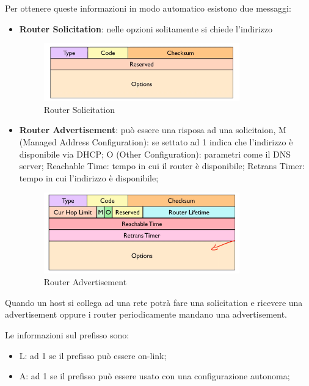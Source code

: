 \documentclass[12pt]{article}
\begin{document}
Per ottenere queste informazioni in modo automatico esistono due messaggi:
\begin{itemize}
    \item \textbf{Router Solicitation}: nelle opzioni solitamente si chiede l'indirizzo
        \begin{figure}[H]
            \centering
            \includegraphics[width=0.8\textwidth]{router-solicitation.png}
            \caption{Router Solicitation}
            \label{fig:router-solicitation}
        \end{figure}
    \item \textbf{Router Advertisement}: pu\`o essere una risposa ad una solicitaion, M (Managed Address Configuration): se settato ad 1 indica che l'indirizzo \`e disponibile via DHCP; O (Other Configuration): parametri come il DNS server; Reachable Time: tempo in cui il router \`e disponibile; Retrans Timer: tempo in cui l'indirizzo \`e disponibile;
        \begin{figure}[H]
            \centering
            \includegraphics[width=0.8\textwidth]{router-advertisement.png}
            \caption{Router Advertisement}
            \label{fig:router-advertisement}
        \end{figure}
\end{itemize}
Quando un host si collega ad una rete potr\`a fare una solicitation e ricevere una advertisement oppure i router periodicamente mandano una advertisement.

Le informazioni sul prefisso sono:
\begin{itemize}
    \item L: ad 1 se il prefisso pu\`o essere on-link;
    \item A: ad 1 se il prefisso pu\`o essere usato con una configurazione autonoma;
\end{itemize}
\end{document}
